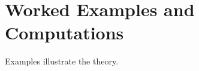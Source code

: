 \section{Worked Examples and Computations}
\label{sec:worked-examples}

Examples illustrate the theory.

